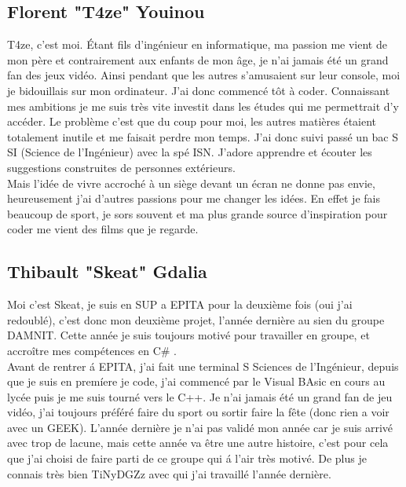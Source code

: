 \documentclass [11pt]{report}
\begin{document}
		\newpage

		\subsection {Florent "T4ze" Youinou}
		T4ze, c’est moi. \'Etant fils d’ingénieur en informatique, ma passion me vient de mon père et contrairement aux enfants de mon âge, je n’ai jamais été un grand fan des jeux vidéo. Ainsi pendant que les autres s’amusaient sur leur console, moi je bidouillais sur mon ordinateur. J’ai donc commencé tôt à coder. Connaissant mes ambitions je me suis très vite investit dans les études qui me permettrait d’y accéder. Le problème c’est que du coup pour moi, les autres matières étaient totalement inutile et me faisait perdre mon temps. J’ai donc suivi passé un bac S SI (Science de l’Ingénieur) avec la spé ISN. J’adore apprendre et écouter les suggestions construites de personnes extérieurs.\\
\indent Mais l’idée de vivre accroché à un siège devant un écran ne donne pas envie, heureusement j’ai d’autres passions pour me changer les idées. En effet je fais beaucoup de sport, je sors souvent et ma plus grande source d’inspiration pour coder me vient des films que je regarde.

	
		\newpage
		
		\subsection {Thibault "Skeat" Gdalia}

			Moi c'est Skeat, je suis en SUP a EPITA pour la deuxi\`eme fois (oui j'ai redoubl\'e),  c'est donc mon deuxi\`eme projet, l'ann\'ee derni\`ere au sien du groupe DAMNIT. Cette ann\'ee je suis toujours motiv\'e pour travailler en groupe, et accro\^itre mes comp\'etences en C\# . 
			\\ \indent  Avant de rentrer \'a EPITA, j'ai fait une terminal S Sciences de l'Ing\'enieur, depuis que je suis en prem\'iere je code, j'ai commenc\'e par le Visual BAsic en cours au lyc\'ee puis je me suis tourn\'e vers le C++. Je n'ai jamais \'et\'e un grand fan de jeu vid\'eo, j'ai toujours pr\'ef\'er\'e faire du sport ou sortir faire la f\^ete (donc rien a voir avec un GEEK). L'ann\'ee derni\`ere je n'ai pas valid\'e mon ann\'ee car je suis arriv\'e avec trop de lacune, mais cette ann\'ee va \^etre une autre histoire, c'est pour cela que j'ai choisi de faire parti de ce groupe qui \'a l'air tr\`es motiv\'e. De plus je connais tr\`es bien TiNyDGZz avec qui j'ai travaill\'e l'ann\'ee derni\`ere.
	
\end{document}
